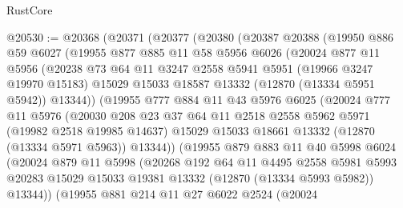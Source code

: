 \begin{lexlean}{RustCore}
\begin{coremodule}
@20530 := @20368
    (@20371
      (@20377
        (@20380
          (@20387
            @20388
            (@19950
              @886
              @59
              @6027
              (@19955
                @877
                @885
                @11
                @58
                @5956
                @6026
                (@20024
                  @877
                  @11
                  @5956
                  (@20238
                    @73
                    @64
                    @11
                    @3247
                    @2558
                    @5941
                    @5951
                    (@19966 @3247 @19970 @15183)
                    @15029
                    @15033
                    @18587
                    @13332
                    (@12870 (@13334 @5951 @5942))
                    @13344))
                (@19955
                  @777
                  @884
                  @11
                  @43
                  @5976
                  @6025
                  (@20024
                    @777
                    @11
                    @5976
                    (@20030
                      @208
                      @23
                      @37
                      @64
                      @11
                      @2518
                      @2558
                      @5962
                      @5971
                      (@19982 @2518 @19985 @14637)
                      @15029
                      @15033
                      @18661
                      @13332
                      (@12870 (@13334 @5971 @5963))
                      @13344))
                  (@19955
                    @879
                    @883
                    @11
                    @40
                    @5998
                    @6024
                    (@20024
                      @879
                      @11
                      @5998
                      (@20268
                        @192
                        @64
                        @11
                        @4495
                        @2558
                        @5981
                        @5993
                        @20283
                        @15029
                        @15033
                        @19381
                        @13332
                        (@12870 (@13334 @5993 @5982))
                        @13344))
                    (@19955
                      @881
                      @214
                      @11
                      @27
                      @6022
                      @2524
                      (@20024

\end{coremodule}
\end{lexlean}

